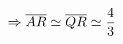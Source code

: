 \documentclass[preview]{standalone}
\begin{document}
\begin{align*}
\Rightarrow \overline{AR} \simeq \overline{QR} \simeq {4 \over 3}
\end{align*}
\end{document}
